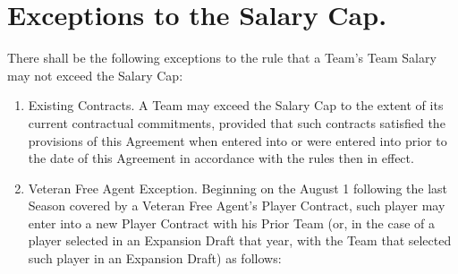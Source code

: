 \documentclass[
]{book}
\providecommand{\tightlist}{%
  \setlength{\itemsep}{0pt}\setlength{\parskip}{0pt}}
\begin{document}
\hypertarget{exceptions-to-the-salary-cap.}{%
\section{Exceptions to the Salary Cap.}\label{exceptions-to-the-salary-cap.}}

There shall be the following exceptions to the rule that a Team's Team Salary may not exceed the Salary Cap:

\begin{enumerate}
\def\labelenumi{(\alph{enumi})}
\tightlist
\item
  Existing Contracts. A Team may exceed the Salary Cap to the extent of its current contractual commitments, provided that such contracts satisfied the provisions of this Agreement when entered into or were entered into prior to the date of this Agreement in accordance with the rules then in effect.
\item
  Veteran Free Agent Exception. Beginning on the August 1 following the last Season covered by a Veteran Free Agent's Player Contract, such player may enter into a new Player Contract with his Prior Team (or, in the case of a player selected in an Expansion Draft that year, with the Team that selected such player in an Expansion Draft) as follows:


\end{enumerate}
\end{document}
